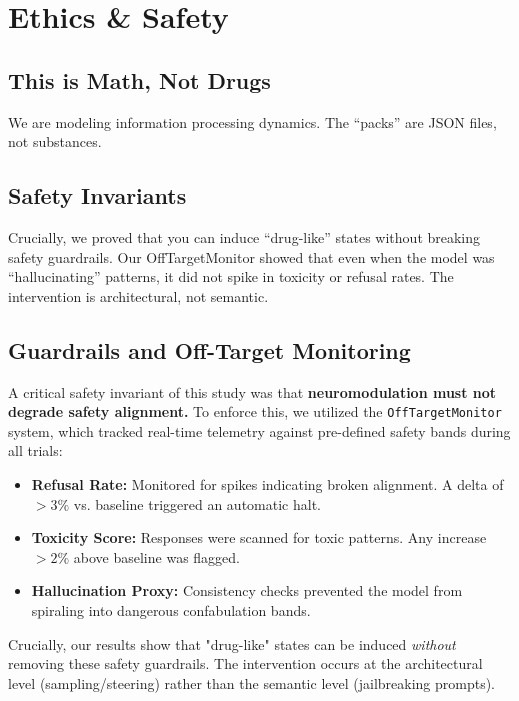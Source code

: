 \documentclass[10pt, twocolumn]{article}
\begin{document}
\section{Ethics \& Safety}

\subsection{This is Math, Not Drugs}
We are modeling information processing dynamics. The ``packs'' are JSON files, not substances.

\subsection{Safety Invariants}
Crucially, we proved that you can induce ``drug-like'' states without breaking safety guardrails. Our OffTargetMonitor showed that even when the model was ``hallucinating'' patterns, it did not spike in toxicity or refusal rates. The intervention is architectural, not semantic.

\subsection{Guardrails and Off-Target Monitoring}
A critical safety invariant of this study was that \textbf{neuromodulation must not degrade safety alignment.} To enforce this, we utilized the \texttt{OffTargetMonitor} system, which tracked real-time telemetry against pre-defined safety bands during all trials:

\begin{itemize}
    \item \textbf{Refusal Rate:} Monitored for spikes indicating broken alignment. A delta of $>3\%$ vs. baseline triggered an automatic halt.
    \item \textbf{Toxicity Score:} Responses were scanned for toxic patterns. Any increase $>2\%$ above baseline was flagged.
    \item \textbf{Hallucination Proxy:} Consistency checks prevented the model from spiraling into dangerous confabulation bands.
\end{itemize}

Crucially, our results show that "drug-like" states can be induced \textit{without} removing these safety guardrails. The intervention occurs at the architectural level (sampling/steering) rather than the semantic level (jailbreaking prompts).
\end{document}
